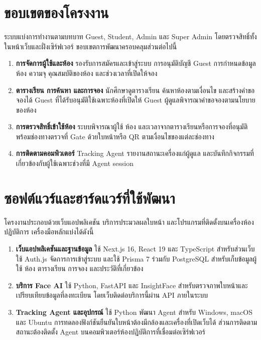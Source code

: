 \documentclass[14pt,a4paper,oneside]{extreport}
\begin{document}
\section{ขอบเขตของโครงงาน}
ระบบแบ่งการทำงานตามบทบาท Guest, Student, Admin และ Super Admin โดยตรวจสิทธิ์ทั้งในหน้าเว็บและฝั่งเซิร์ฟเวอร์ ขอบเขตการพัฒนาครอบคลุมส่วนต่อไปนี้
\begin{enumerate}
\item \textbf{การจัดการผู้ใช้และห้อง} รองรับการสมัครและเข้าสู่ระบบ การอนุมัติบัญชี Guest การกำหนดข้อมูลห้อง ความจุ คุณสมบัติของห้อง และช่วงเวลาที่เปิดให้จอง
\item \textbf{ตารางเรียน การค้นหา และการจอง} นักศึกษาดูตารางเรียน ค้นหาห้องตามเงื่อนไข และสร้างคำขอจองได้ Guest ที่ได้รับอนุมัติใช้เฉพาะห้องที่เปิดให้ Guest ผู้ดูแลพิจารณาคำขอจองตามนโยบายของห้อง
\item \textbf{การตรวจสิทธิ์เข้าใช้ห้อง} ระบบพิจารณาผู้ใช้ ห้อง และเวลาจากตารางเรียนหรือการจองที่อนุมัติ พร้อมช่องทางตรวจที่ Gate ด้วยใบหน้าหรือ QR ตามเงื่อนไขของแต่ละช่องทาง
\item \textbf{การติดตามคอมพิวเตอร์} Tracking Agent รายงานสถานะเครื่องแก่ผู้ดูแล และบันทึกกิจกรรมที่เกี่ยวข้องกับผู้ใช้เฉพาะช่วงที่มี Agent session
\end{enumerate}

\section{ซอฟต์แวร์และฮาร์ดแวร์ที่ใช้พัฒนา}
โครงงานประกอบด้วยเว็บแอปพลิเคชัน บริการประมวลผลใบหน้า และโปรแกรมที่ติดตั้งบนเครื่องห้องปฏิบัติการ เครื่องมือหลักแบ่งได้ดังนี้
\begin{enumerate}
\item \textbf{เว็บแอปพลิเคชันและฐานข้อมูล} ใช้ Next.js 16, React 19 และ TypeScript สำหรับส่วนเว็บ ใช้ Auth.js จัดการการเข้าสู่ระบบ และใช้ Prisma 7 ร่วมกับ PostgreSQL สำหรับเก็บข้อมูลผู้ใช้ ห้อง ตารางเรียน การจอง และประวัติที่เกี่ยวข้อง
\item \textbf{บริการ Face AI} ใช้ Python, FastAPI และ InsightFace สำหรับตรวจภาพใบหน้าและเปรียบเทียบข้อมูลที่ลงทะเบียน โดยเว็บติดต่อบริการนี้ผ่าน API ภายในระบบ
\item \textbf{Tracking Agent และอุปกรณ์} ใช้ Python พัฒนา Agent สำหรับ Windows, macOS และ Ubuntu การทดลองฟังก์ชันยืนยันใบหน้าต้องมีกล้องและเครื่องที่เปิดเว็บได้ ส่วนการติดตามสถานะต้องติดตั้ง Agent บนคอมพิวเตอร์ห้องปฏิบัติการที่เชื่อมต่อเซิร์ฟเวอร์
\end{enumerate}
\end{document}
